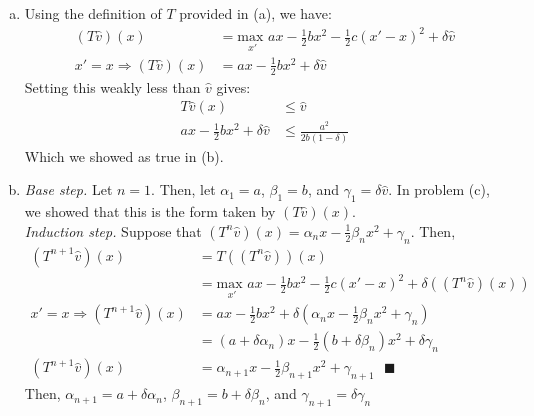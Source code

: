 \documentclass{article}
\newcommand{\usmax}[1]{\underset{#1}{\text{max }}}
\newcommand{\vhat}{\hat{v}}
\begin{document}
\begin{enumerate}[(a)]
	\item Using the definition of $T$ provided in (a), we have:
		\begin{align*}
			(T\hat{v})(x) &= \usmax{x'}ax-\frac{1}{2}bx^2 - \frac{1}{2}c(x'-x)^2 + \delta \vhat	\\
			x'=x \Rightarrow (T\hat{v})(x) &= ax-\frac{1}{2}bx^2  + \delta \vhat
		\end{align*}
		Setting this weakly less than $\hat{v}$ gives:
		\begin{align*}
			T\hat{v}(x) &\leq \hat{v}	\\
			ax-\frac{1}{2}bx^2  + \delta \vhat  &\leq \frac{a^2}{2b(1-\delta)}	
		\end{align*}
		Which we showed as true in (b).
	
	\item \textit{Base step.} Let $n=1$. Then, let ${\alpha_1=a}$, ${\beta_1=b}$, and ${\gamma_1=\delta\vhat}$. In problem (c), we showed that this is the form taken by ${(T\vhat)(x)}$.
		\medskip \\
		\textit{Induction step.} Suppose that ${(T^n\vhat)(x) = \alpha_nx-\frac{1}{2}\beta_nx^2 + \gamma_n}$. Then,
		\begin{align*}
			(T^{n+1}\vhat)(x) 	&= T((T^n\vhat))(x)															\\
								&= \usmax{x'}ax-\frac{1}{2}bx^2 - \frac{1}{2}c(x'-x)^2 + \delta \left((T^n\vhat)(x)\right)	\\
			x'=x \Rightarrow (T^{n+1}\vhat)(x) &= ax-\frac{1}{2}bx^2  + \delta \left(\alpha_nx-\frac{1}{2}\beta_nx^2 + \gamma_n\right)	\\
								&= (a + \delta\alpha_n)x - \frac{1}{2}(b+\delta\beta_n)x^2 + \delta\gamma_n								\\
			(T^{n+1}\vhat)(x) 	&= \alpha_{n+1}x - \frac{1}{2}\beta_{n+1}x^2 + \gamma_{n+1}\text{ }\blacksquare
		\end{align*}
		Then, ${\alpha_{n+1} = a+\delta\alpha_n}$, ${\beta_{n+1} = b + \delta\beta_n}$, and ${\gamma_{n+1}=\delta\gamma_n}$
	

\end{enumerate}
\end{document}
